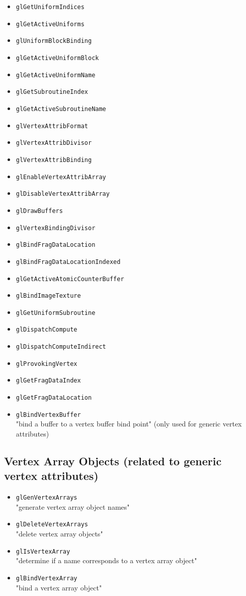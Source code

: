 \documentclass[12pt]{article}
\begin{document}
\begin{itemize}
\item \texttt{glGetUniformIndices}
\item \texttt{glGetActiveUniforms}
\item \texttt{glUniformBlockBinding}
\item \texttt{glGetActiveUniformBlock}
\item \texttt{glGetActiveUniformName}
\item \texttt{glGetSubroutineIndex}
\item \texttt{glGetActiveSubroutineName}
\item \texttt{glVertexAttribFormat}
\item \texttt{glVertexAttribDivisor}
\item \texttt{glVertexAttribBinding}
\item \texttt{glEnableVertexAttribArray}
\item \texttt{glDisableVertexAttribArray}
\item \texttt{glDrawBuffers}
\item \texttt{glVertexBindingDivisor}
\item \texttt{glBindFragDataLocation}
\item \texttt{glBindFragDataLocationIndexed}
\item \texttt{glGetActiveAtomicCounterBuffer}
\item \texttt{glBindImageTexture}
\item \texttt{glGetUniformSubroutine}
\item \texttt{glDispatchCompute}
\item \texttt{glDispatchComputeIndirect}
\item \texttt{glProvokingVertex}
\item \texttt{glGetFragDataIndex}
\item \texttt{glGetFragDataLocation}
\item \texttt{glBindVertexBuffer} \\
	"bind a buffer to a vertex buffer bind point" (only used for generic vertex attributes)
\end{itemize}

\subsection{Vertex Array Objects (related to generic vertex attributes)}
\begin{itemize}
\item \texttt{glGenVertexArrays} \\
	"generate vertex array object names"
\item \texttt{glDeleteVertexArrays} \\
	"delete vertex array objects"
\item \texttt{glIsVertexArray} \\
	"determine if a name corresponds to a vertex array object"
\item \texttt{glBindVertexArray} \\
	"bind a vertex array object"
\end{itemize}
\end{document}
